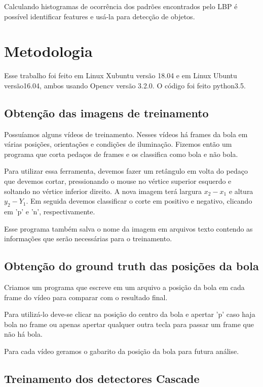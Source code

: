 \documentclass{bmvc2k}
\begin{document}
Calculando histogramas de ocorrência dos padrões encontrados pelo LBP é possível identificar features e usá-la para detecção de objetos.


\section{Metodologia}
\label{met}

Esse trabalho foi feito em Linux Xubuntu versão 18.04 e em Linux Ubuntu versão16.04, ambos usando Opencv versão 3.2.0. O código foi feito python3.5.

\subsection{Obtenção das imagens de treinamento}

Possuíamos alguns vídeos de treinamento. Nesses vídeos há frames da bola em várias posições, orientações e condições de iluminação. Fizemos então um programa que corta pedaços de frames e os classifica como bola e não bola.

Para utilizar essa ferramenta, devemos fazer um retângulo em volta do pedaço que devemos cortar, pressionando o mouse no vértice superior esquerdo e soltando no vértice inferior direito. A nova imagem terá largura $x_2-x_1$ e altura $y_2-Y_1$. Em seguida devemos classificar o corte em positivo e negativo, clicando em 'p' e 'n', respectivamente.

Esse programa também salva o nome da imagem em arquivos texto contendo as informações que serão necessárias para o treinamento.

\subsection{Obtenção do ground truth das posições da bola}

Criamos um programa que escreve em um arquivo a posição da bola em cada frame do vídeo para comparar com o resultado final. 

Para utilizá-lo deve-se clicar na posição do centro da bola e apertar 'p' caso haja bola no frame ou apenas apertar qualquer outra tecla para passar um frame que não há bola.

Para cada vídeo geramos o gabarito da posição da bola para futura análise.

\subsection{Treinamento dos detectores Cascade}
\end{document}
